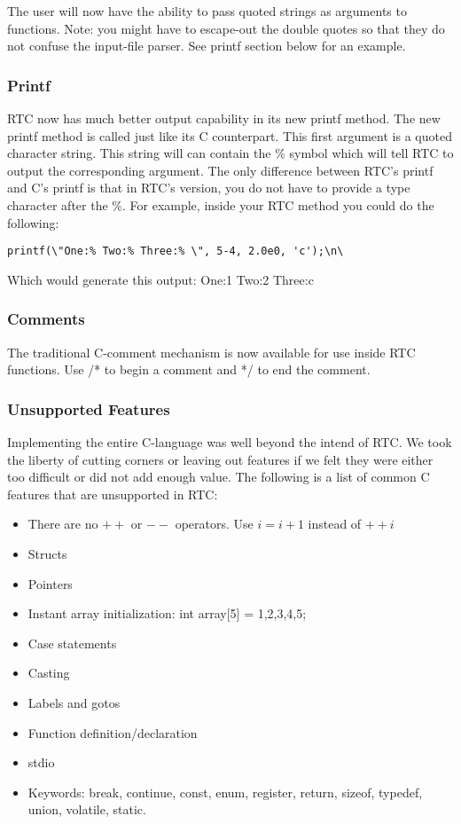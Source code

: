 The user will now have the ability to pass quoted strings as arguments to
functions. Note: you might have to escape-out the double quotes so that they
do not confuse the input-file parser. See printf section below for an example.

\subsubsection{Printf}

RTC now has much better output capability in its new printf method. The
new printf method is called just like its C counterpart. This first argument
is a quoted character string. This string will can contain the \% symbol
which will tell RTC to output the corresponding argument. The only difference
between RTC's printf and C's printf is that in RTC's version, you do not have
to provide a type character after the \%. For example, inside your RTC method
you could do the following:

{\ttfamily \begin{verbatim}
printf(\"One:% Two:% Three:% \", 5-4, 2.0e0, 'c');\n\
\end{verbatim} }

\noindent
Which would generate this output: One:1 Two:2 Three:c

\subsubsection{Comments}

The traditional C-comment mechanism is now available for use inside RTC
functions. Use /* to begin a comment and */ to end the comment.

\subsubsection{Unsupported Features}

Implementing the entire C-language was well beyond the intend of RTC. We took
the liberty of cutting corners or leaving out features if we felt they were
either too difficult or did not add enough value. The following is a list
of common C features that are unsupported in RTC:
\begin{itemize}
  \item There are no $++$ or $--$ operators. Use $i = i + 1$ instead of $++i$
  \item Structs
  \item Pointers
  \item Instant array initialization: int array[5] = {1,2,3,4,5};
  \item Case statements
  \item Casting
  \item Labels and gotos
  \item Function definition/declaration
  \item stdio
  \item Keywords: break, continue, const, enum, register, return, sizeof,
    typedef, union, volatile, static.
\end{itemize}

